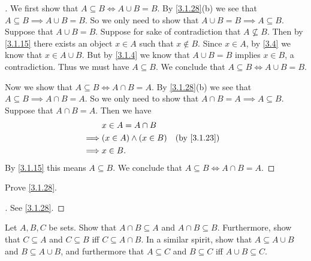\begin{proof}[]
  We first show that \(A \subseteq B \iff A \cup B = B\).
  By \cref{3.1.28}(b) we see that \(A \subseteq B \implies A \cup B = B\).
  So we only need to show that \(A \cup B = B \implies A \subseteq B\).
  Suppose that \(A \cup B = B\).
  Suppose for sake of contradiction that \(A \not\subseteq B\).
  Then by \cref{3.1.15} there exists an object \(x \in A\) such that \(x \notin B\).
  Since \(x \in A\), by \cref{3.4} we know that \(x \in A \cup B\).
  But by \cref{3.1.4} we know that \(A \cup B = B\) implies \(x \in B\), a contradiction.
  Thus we must have \(A \subseteq B\).
  We conclude that \(A \subseteq B \iff A \cup B = B\).

  Now we show that \(A \subseteq B \iff A \cap B = A\).
  By \cref{3.1.28}(b) we see that \(A \subseteq B \implies A \cap B = A\).
  So we only need to show that \(A \cap B = A \implies A \subseteq B\).
  Suppose that \(A \cap B = A\).
  Then we have
  \begin{align*}
             & x \in A = A \cap B                         \\
    \implies & (x \in A) \land (x \in B) &  & \by{3.1.23} \\
    \implies & x \in B.
  \end{align*}
  By \cref{3.1.15} this means \(A \subseteq B\).
  We conclude that \(A \subseteq B \iff A \cap B = A\).
\end{proof}

\begin{ex}\label{ex:3.1.6}
  Prove \cref{3.1.28}.
\end{ex}

\begin{proof}[]
  See \cref{3.1.28}.
\end{proof}

\begin{ex}\label{ex:3.1.7}
  Let \(A, B, C\) be sets.
  Show that \(A \cap B \subseteq A\) and \(A \cap B \subseteq B\).
  Furthermore, show that \(C \subseteq A\) and \(C \subseteq B\) iff \(C \subseteq A \cap B\).
  In a similar spirit, show that \(A \subseteq A \cup B\) and \(B \subseteq A \cup B\), and furthermore that \(A \subseteq C\) and \(B \subseteq C\) iff \(A \cup B \subseteq C\).
\end{ex}

